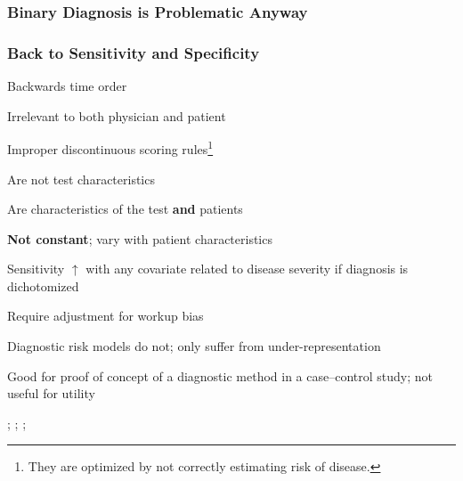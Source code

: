 \subsubsection{Binary Diagnosis is Problematic Anyway}

\subsubsection{Back to Sensitivity and Specificity}
\bi
\item Backwards time order
\item Irrelevant to both physician and patient
\item Improper discontinuous scoring rules\footnote{They are optimized
    by not correctly estimating risk of disease.}
\item Are not test characteristics
 \bi
 \item Are characteristics of the test \textbf{and} patients
 \ei
\item \textbf{Not constant}; vary with patient characteristics
 \bi
 \item Sensitivity $\uparrow$ with any covariate related to disease
 severity if diagnosis is dichotomized
 \ei
\item Require adjustment for workup bias
 \bi
 \item Diagnostic risk models do not; only suffer from under-representation
 \ei
\item Good for proof of concept of a diagnostic method in a
 case--control study; not useful for utility
\ei

\citet{hla84fac}; \cite{moo97lim}; \citet{moo03sen}; \citet{gne07str}

